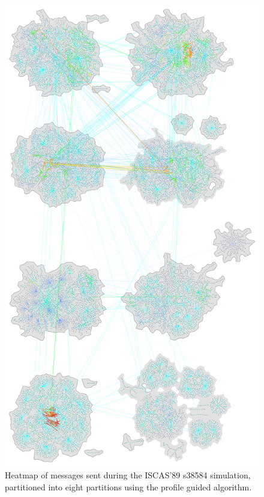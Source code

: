 \documentclass[11pt]{book}
\begin{document}
\begin{figure}
\centering
\includegraphics[width=\textwidth,height=0.9\textheight,keepaspectratio]{figs/s38584_8part}
\caption{Heatmap of messages sent during the ISCAS'89 s38584 simulation, partitioned into eight partitions using the profile guided algorithm.}
\end{figure}


 \markright{ }
\end{document}
